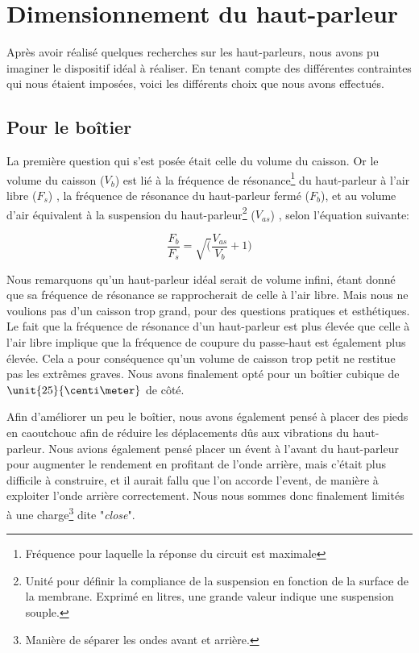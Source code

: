 

\section{Dimensionnement du haut-parleur}
Après avoir réalisé quelques recherches sur les haut-parleurs, nous avons pu imaginer le dispositif idéal 
à réaliser. En tenant compte des différentes contraintes qui nous étaient imposées, voici les différents 
choix que nous avons effectués.

\subsection{Pour le boîtier}
La première question qui s'est posée était celle du volume du caisson. Or le volume du caisson ($V_b$) est 
lié à la fréquence de résonance\footnote{Fréquence pour laquelle la réponse du circuit est maximale} du 
haut-parleur à l'air libre ($F_s$) , la fréquence de résonance du haut-parleur fermé ($F_b$), et au volume 
d'air équivalent à la suspension du haut-parleur\footnote{Unité pour définir la compliance de la suspension 
en fonction de la surface de la membrane. Exprimé en litres, une grande valeur indique une suspension 
souple\cite{?}.} ($V_{as}$) , selon l'équation suivante\cite{?}:

$$\frac{F_b}{F_s} = \sqrt(\frac{V_{as}}{V_b} +1)$$

Nous remarquons qu'un haut-parleur idéal serait de volume infini, étant donné que sa fréquence de résonance 
se rapprocherait de celle à l'air libre. Mais nous ne voulions pas d'un caisson trop grand, pour des questions pratiques et esthétiques.
Le fait que la fréquence de résonance d'un haut-parleur est plus élevée que celle à l'air libre implique que
la fréquence de coupure du passe-haut est également plus élevée. Cela a pour conséquence
qu'un volume de caisson trop petit ne restitue pas les extrêmes graves. Nous avons finalement opté pour un boîtier 
cubique de $\unit{25}{\centi\meter}$ de côté.   

Afin d'améliorer un peu le boîtier, nous avons également pensé à placer des pieds en caoutchouc afin de
réduire les déplacements dûs aux vibrations du haut-parleur. Nous avions également pensé placer un évent à l'avant du haut-parleur 
pour augmenter le rendement en profitant de l'onde arrière, mais c'était plus difficile à construire, et 
il aurait fallu que l'on accorde l'event, de manière à exploiter l'onde arrière correctement. Nous nous 
sommes donc finalement limités à une charge\footnote{Manière de séparer les ondes avant et arrière.} dite 
"\textit{close}"\cite{close}.


